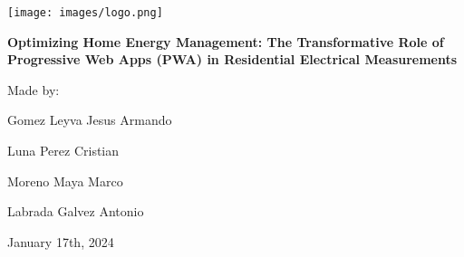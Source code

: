 \documentclass{article}
\begin{document}
\begin{titlepage}
    \centering
    \texttt{[image: images/logo.png]}
    
    \vspace{2cm}

    {\fontsize{24pt}{28.8pt}\selectfont {}\selectfont \textbf{Optimizing Home Energy Management: The Transformative Role of Progressive Web Apps (PWA) in Residential Electrical Measurements}}
    \vspace{1cm}
    
    {\Large Made by:}

    \vspace{1cm}

    {\fontsize{10pt}{28.8pt}\selectfont Gomez Leyva Jesus Armando}

    \vspace{0.5cm}
    {\fontsize{10pt}{28.8pt}\selectfont Luna Perez Cristian}

    \vspace{0.5cm}
    {\fontsize{10pt}{28.8pt}\selectfont Moreno Maya Marco}

    \vspace{0.5cm}
    {\fontsize{10pt}{28.8pt}\selectfont Labrada Galvez Antonio}
    
    \vspace{2cm}
    
    {\large January 17th, 2024}
    
\end{titlepage}
\end{document}
